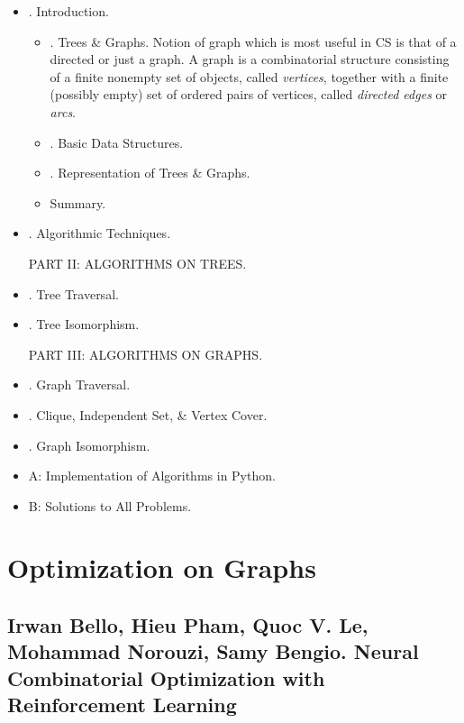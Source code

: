 \documentclass{article}
\begin{document}
\begin{itemize}
	\item {. Introduction.}
	\begin{itemize}
		\item {. Trees \& Graphs.} Notion of graph which is most useful in CS is that of a directed or just a graph. A graph is a combinatorial structure consisting of a finite nonempty set of objects, called {\it vertices}, together with a finite (possibly empty) set of ordered pairs of vertices, called {\it directed edges} or {\it arcs}.
		\item {. Basic Data Structures.}
		\item {. Representation of Trees \& Graphs.}
		\item {\sf Summary.}
	\end{itemize}
	\item {. Algorithmic Techniques.}
	
	{\sf PART II: ALGORITHMS ON TREES.}
	\item {. Tree Traversal.}
	\item {. Tree Isomorphism.}
	
	{\sf PART III: ALGORITHMS ON GRAPHS.}
	\item {. Graph Traversal.}
	\item {. Clique, Independent Set, \& Vertex Cover.}
	\item {. Graph Isomorphism.}
	\item {\sf A: Implementation of Algorithms in Python.}
	\item {\sf B: Solutions to All Problems.}
\end{itemize}


\section{Optimization on Graphs}


\subsection{{\sc Irwan Bello, Hieu Pham, Quoc V. Le, Mohammad Norouzi, Samy Bengio}. Neural Combinatorial Optimization with Reinforcement Learning}
\end{document}
